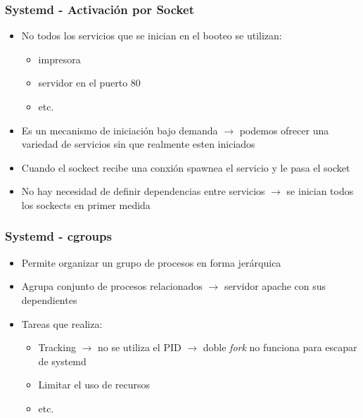 \begin{frame}
  	\frametitle{\textbf{Systemd} - Activación por Socket}
  	\begin{itemize}
		\item No todos los servicios que se inician en el booteo se utilizan:
		\begin{itemize}
			\item impresora
			\item servidor en el puerto 80
			\item etc.
		\end{itemize}
		\item Es un mecanismo de iniciación bajo demanda $\rightarrow$ podemos ofrecer una variedad de servicios sin que realmente esten iniciados
		\item Cuando el sockect recibe una conxión spawnea el servicio y le pasa el socket
		\item No hay necesidad de definir dependencias entre servicios $\rightarrow$ se inician todos los sockects en primer medida
  	\end{itemize}
\end{frame}

\begin{frame}
  	\frametitle{\textbf{Systemd} - \textbf{cgroups}}
  	\begin{itemize}
		\item Permite organizar un grupo de procesos en forma jerárquica
		\item Agrupa conjunto de procesos relacionados $\rightarrow$ servidor apache con sus dependientes
		\item Tareas que realiza:
		\begin{itemize}
			\item Tracking $\rightarrow$ no se utiliza el PID $\rightarrow$ doble \emph{fork} no funciona para escapar de systemd
			\item Limitar el uso de recursos
			\item etc.
		\end{itemize}
  	\end{itemize}
\end{frame}

